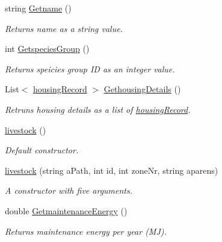 \begin{DoxyCompactItemize}
\mbox{\label{classlivestock_a2658697a2991be8744dbbf6d366cf5dd}} 
string \mbox{\hyperlink{classlivestock_a2658697a2991be8744dbbf6d366cf5dd}{Getname}} ()
\begin{DoxyCompactList}\small\item\em Returns name as a string value. \end{DoxyCompactList}\item 
\mbox{\label{classlivestock_a200482fb144d5a84bacd585f9d5cf8f5}} 
int \mbox{\hyperlink{classlivestock_a200482fb144d5a84bacd585f9d5cf8f5}{Getspecies\+Group}} ()
\begin{DoxyCompactList}\small\item\em Returns speicies group ID as an integer value. \end{DoxyCompactList}\item 
\mbox{\label{classlivestock_aa3e2e6b89d7fc483057d72a2a9a9d742}} 
List$<$ \mbox{\hyperlink{structlivestock_1_1housing_record}{housing\+Record}} $>$ \mbox{\hyperlink{classlivestock_aa3e2e6b89d7fc483057d72a2a9a9d742}{Gethousing\+Details}} ()
\begin{DoxyCompactList}\small\item\em Retruns housing details as a list of \mbox{\hyperlink{structlivestock_1_1housing_record}{housing\+Record}}. \end{DoxyCompactList}\item 
\mbox{\label{classlivestock_a0f351330e7211a1c52533fb79f37ac3d}} 
\mbox{\hyperlink{classlivestock_a0f351330e7211a1c52533fb79f37ac3d}{livestock}} ()
\begin{DoxyCompactList}\small\item\em Default constructor. \end{DoxyCompactList}\item 
\mbox{\hyperlink{classlivestock_a1fde1733d76ceeb2b4337ded5580aa7a}{livestock}} (string a\+Path, int id, int zone\+Nr, string aparens)
\begin{DoxyCompactList}\small\item\em A constructor with five arguments. \end{DoxyCompactList}\item 
double \mbox{\hyperlink{classlivestock_a95f8f38c956fbaa68522def23741e9c3}{Getmaintenance\+Energy}} ()
\begin{DoxyCompactList}\small\item\em Returns maintenance energy per year (MJ). \end{DoxyCompactList}\item 

\end{DoxyCompactItemize}
